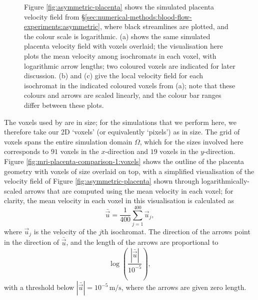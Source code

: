 \begin{figure}
\begin{centering}
\begin{subfigure}{0.45\textwidth}
\begin{centering}
                        \caption{}
                        \label{fig:mri-placenta-comparison-1:green-flow}
                    \end{centering}
                \end{subfigure}
            \end{centering}
            \caption{Figure \ref{fig:asymmetric-placenta} shows the simulated placenta velocity field from \S\ref{sec:numerical-methods:blood-flow-experiments:asymmetric}, where black streamlines are plotted, and the colour scale is logarithmic. (a) shows the same simulated placenta velocity field with voxels overlaid; the visualisation here plots the mean velocity among isochromats in each voxel, with logarithmic arrow lengths; two coloured voxels are indicated for later discussion. (b) and (c) give the local velocity field for each isochromat in the indicated coloured voxels from (a); note that these colours and arrows are scaled linearly, and the colour bar ranges differ between these plots.}
        \end{figure}
        
        The voxels used by \citeauthor{dellschaftHaemodynamicsHumanPlacenta2020} \cite{dellschaftHaemodynamicsHumanPlacenta2020} are  in size; for the simulations that we perform here, we therefore take our 2D `voxels' (or equivalently `pixels') as  in size. The grid of voxels spans the entire simulation domain $\Omega$, which for the sizes involved here corresponds to $91$ voxels in the $x$-direction and $19$ voxels in the $y$-direction. Figure \ref{fig:mri-placenta-comparison-1:voxels} shows the outline of the placenta geometry with voxels of size  overlaid on top, with a simplified visualisation of the velocity field of Figure \ref{fig:asymmetric-placenta} shown through logarithmically-scaled arrows that are computed using the mean velocity in each voxel; for clarity, the mean velocity in each voxel in this visualisation is calculated as
        \begin{equation}
            \bar{\vec{u}} = \frac{1}{400} \sum_{j=1}^{400} \vec{u}_j,
        \end{equation}
        where $\vec{u}_j$ is the velocity of the $j$th isochromat. The direction of the arrows point in the direction of $\bar{\vec{u}}$, and the length of the arrows are proportional to
        \begin{equation*}
            \log\left( \frac{|\bar{\vec{u}}|}{10^{-5}} \right),
        \end{equation*}
        with a threshold below $|\bar{\vec{u}}| = 10^{-5}\,\unit{\metre\per\second}$, where the arrows are given zero length.
        
